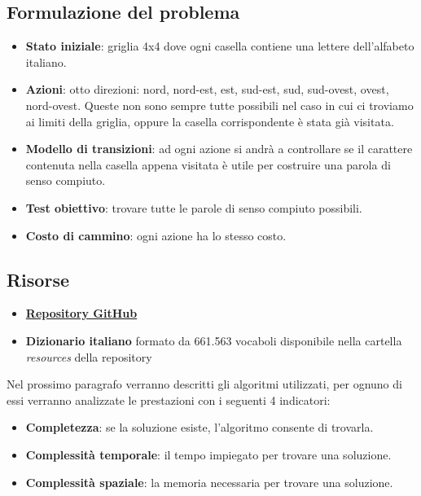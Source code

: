 \documentclass[10pt,a4paper]{article}
\begin{document}
	\subsection{Formulazione del problema}
	\begin{itemize}
		\item \textbf{Stato iniziale}: griglia 4x4 dove ogni casella contiene una lettere dell'alfabeto italiano.
		\item \textbf{Azioni}: otto direzioni: nord, nord-est, est, sud-est, sud, sud-ovest, ovest, nord-ovest. Queste non sono sempre tutte possibili nel caso in cui ci troviamo ai limiti della griglia, oppure la casella corrispondente è stata già visitata.
		\item \textbf{Modello di transizioni}: ad ogni azione si andrà a controllare se il carattere contenuta nella casella appena visitata è utile per costruire una parola di senso compiuto.
		\item \textbf{Test obiettivo}: trovare tutte le parole di senso compiuto possibili.
		\item\textbf{Costo di cammino}: ogni azione ha lo stesso costo.
	\end{itemize}
	\subsection{Risorse}
	\begin{itemize}
		\item \href{https://github.com/RazzoloDevs/Razzolo}{\textbf{Repository GitHub}}
		\item \textbf{Dizionario italiano} formato da 661.563 vocaboli disponibile nella cartella \textit{resources} della repository
	\end{itemize}
	Nel prossimo paragrafo verranno descritti gli algoritmi utilizzati, per ognuno di essi verranno analizzate le prestazioni con i seguenti 4 indicatori:
	\begin{itemize}
		\item \textbf{Completezza}: se la soluzione esiste, l'algoritmo consente di trovarla.
		\item \textbf{Complessità temporale}: il tempo impiegato per trovare una soluzione.
		\item \textbf{Complessità spaziale}: la memoria necessaria per trovare una soluzione.
	\end{itemize}
	\newpage
\end{document}
